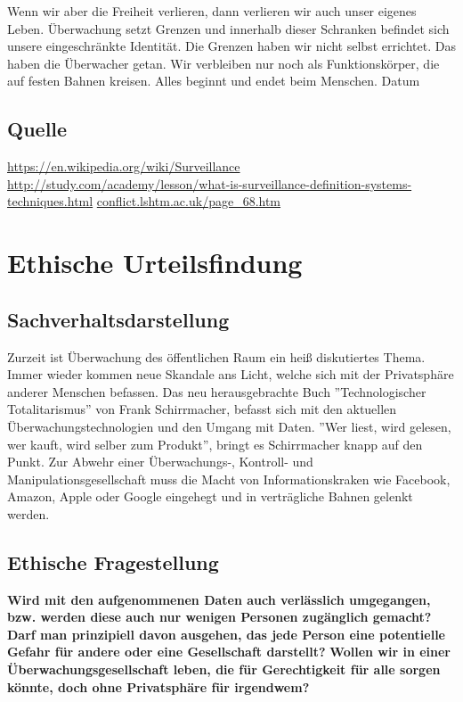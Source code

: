 	Wenn wir aber die Freiheit verlieren, dann verlieren wir auch unser eigenes Leben. Überwachung setzt Grenzen und innerhalb dieser Schranken befindet sich unsere eingeschränkte Identität. Die Grenzen haben wir nicht selbst errichtet. Das haben die Überwacher getan. Wir verbleiben nur noch als Funktionskörper, die auf festen Bahnen kreisen. Alles beginnt und endet beim Menschen.
	Datum
	
	\subsection{Quelle}
	\url{https://en.wikipedia.org/wiki/Surveillance} \newline
	\url{http://study.com/academy/lesson/what-is-surveillance-definition-systems-techniques.html} \newline
	\url{conflict.lshtm.ac.uk/page_68.htm} \newline
 
	\newpage
\section{Ethische Urteilsfindung}

	\subsection{Sachverhaltsdarstellung}
	
	Zurzeit ist Überwachung des öffentlichen Raum ein heiß diskutiertes Thema. Immer wieder kommen neue Skandale ans Licht, welche sich mit der Privatsphäre anderer Menschen befassen. 
	Das neu herausgebrachte Buch ''Technologischer Totalitarismus'' von Frank Schirrmacher, befasst sich mit den aktuellen Überwachungstechnologien und den Umgang mit Daten. ''Wer liest, wird gelesen, wer kauft, wird selber zum Produkt'', bringt es Schirrmacher knapp auf den Punkt. Zur Abwehr einer Überwachungs-, Kontroll- und Manipulationsgesellschaft muss die Macht von Informationskraken wie Facebook, Amazon, Apple oder Google eingehegt und in verträgliche Bahnen gelenkt werden.
	
	\subsection{Ethische Fragestellung}
	
	\textbf{Wird mit den aufgenommenen Daten auch verlässlich umgegangen, bzw. werden diese auch nur wenigen Personen zugänglich gemacht?} \newline
	\newline
	\textbf{Darf man prinzipiell davon ausgehen, das jede Person eine potentielle Gefahr für andere oder eine Gesellschaft darstellt?} \newline
	\newline
	\textbf{Wollen wir in einer Überwachungsgesellschaft leben, die für Gerechtigkeit für alle sorgen könnte, doch ohne Privatsphäre für irgendwem?} \newline
	
